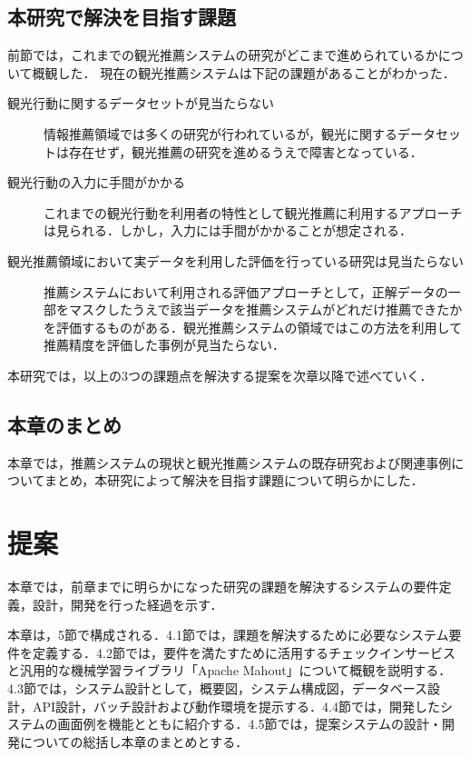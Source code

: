 \documentclass{jsarticle}
\begin{document}
\subsection{本研究で解決を目指す課題}
\label{problem}

前節では，これまでの観光推薦システムの研究がどこまで進められているかについて概観した．
現在の観光推薦システムは下記の課題があることがわかった．

\begin{description}
\item[観光行動に関するデータセットが見当たらない]
       情報推薦領域では多くの研究が行われているが，観光に関するデータセットは存在せず，観光推薦の研究を進めるうえで障害となっている．
\item[観光行動の入力に手間がかかる]
       これまでの観光行動を利用者の特性として観光推薦に利用するアプローチは見られる．しかし，入力には手間がかかることが想定される．
\item[観光推薦領域において実データを利用した評価を行っている研究は見当たらない]
       推薦システムにおいて利用される評価アプローチとして，正解データの一部をマスクしたうえで該当データを推薦システムがどれだけ推薦できたかを評価するものがある．観光推薦システムの領域ではこの方法を利用して推薦精度を評価した事例が見当たらない．
\end{description}

本研究では，以上の3つの課題点を解決する提案を次章以降で述べていく．

\subsection{本章のまとめ}

本章では，推薦システムの現状と観光推薦システムの既存研究および関連事例についてまとめ，本研究によって解決を目指す課題について明らかにした． 

\newpage

\section{提案}

本章では，前章までに明らかになった研究の課題を解決するシステムの要件定義，設計，開発を行った経過を示す．

本章は，5節で構成される．4.1節では，課題を解決するために必要なシステム要件を定義する．4.2節では，要件を満たすために活用するチェックインサービスと汎用的な機械学習ライブラリ「Apache Mahout」について概観を説明する．4.3節では，システム設計として，概要図，システム構成図，データベース設計，API設計，バッチ設計および動作環境を提示する．4.4節では，開発したシステムの画面例を機能とともに紹介する．4.5節では，提案システムの設計・開発についての総括し本章のまとめとする．
\end{document}
